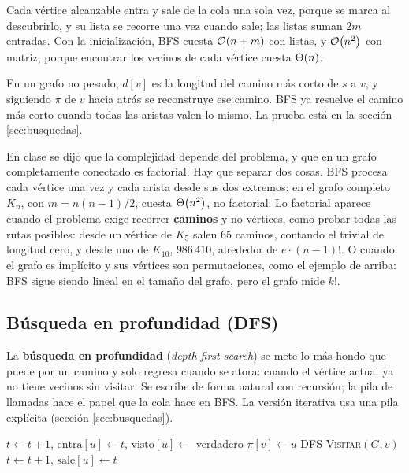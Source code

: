 \documentclass[11pt,letterpaper]{article}
\begin{document}
Cada vértice alcanzable entra y sale de la cola una sola vez, porque
se marca al descubrirlo, y su lista se recorre una vez cuando sale;
las listas suman $2m$ entradas. Con la inicialización, BFS cuesta
$\mathcal{O}\!\left(n + m\right)$ con listas, y $\mathcal{O}\!\left(n^2\right)$ con matriz, porque encontrar
los vecinos de cada vértice cuesta $\Theta\!\left(n\right)$.

\begin{idea}
  En un grafo no pesado, $d[v]$ es la longitud del camino más corto de
  $s$ a $v$, y siguiendo $\pi$ de $v$ hacia atrás se reconstruye ese
  camino. BFS ya resuelve el camino más corto cuando todas las aristas
  valen lo mismo. La prueba está en la sección \ref{sec:busquedas}.
\end{idea}

\begin{ojo}
  En clase se dijo que la complejidad depende del problema, y que en un
  grafo completamente conectado es factorial. Hay que separar dos
  cosas. BFS procesa cada vértice una vez y cada arista desde sus dos
  extremos: en el grafo completo $K_n$, con $m = n(n-1)/2$, cuesta
  $\Theta\!\left(n^2\right)$, no factorial. Lo factorial aparece cuando el problema
  exige recorrer \textbf{caminos} y no vértices, como probar todas las
  rutas posibles: desde un vértice de $K_5$ salen $65$ caminos,
  contando el trivial de longitud cero, y desde uno de $K_{10}$,
  $986\,410$, alrededor de $e \cdot (n-1)!$. O cuando el grafo es
  implícito y sus vértices son permutaciones, como el ejemplo de
  arriba: BFS sigue siendo lineal en el tamaño del grafo, pero el
  grafo mide $k!$.
\end{ojo}


\subsection*{Búsqueda en profundidad (DFS)}

La \textbf{búsqueda en profundidad} (\textit{depth-first search}) se
mete lo más hondo que puede por un camino y solo regresa cuando se
atora: cuando el vértice actual ya no tiene vecinos sin visitar. Se
escribe de forma natural con recursión; la pila de llamadas hace el
papel que la cola hace en BFS. La versión iterativa usa una pila
explícita (sección \ref{sec:busquedas}).

\begin{algorithm}[H]
\caption{\textsc{DFS-Visitar}$(G, u)$}
\begin{algorithmic}[1]
\State $t \gets t + 1$, \quad $\text{entra}[u] \gets t$, \quad
       $\text{visto}[u] \gets$ verdadero
    \State $\pi[v] \gets u$
    \State \textsc{DFS-Visitar}$(G, v)$
  \EndIf
\EndFor
\State $t \gets t + 1$, \quad $\text{sale}[u] \gets t$
\end{algorithmic}
\end{algorithm}
\end{document}
